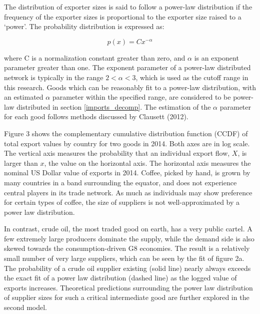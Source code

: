 \documentclass[10pt,letterpaper]{article}
\begin{document}
The distribution of exporter sizes is said to follow a power-law distribution if the frequency of the exporter sizes is proportional to the exporter size raised to a `power'. The probability distribution is expressed as:

\begin{equation}
p(x) = Cx^{-\alpha}
\end{equation}

where C is a normalization constant greater than zero, and $\alpha$ is an exponent parameter greater than one. The exponent parameter of a power-law distributed network is typically in the range $2 < \alpha < 3$, which is used as the cutoff range in this research. Goods which can be reasonably fit to a power-law distribution, with an estimated $\alpha$ parameter within the specified range, are considered to be power-law distributed in section \ref{imports_decomp}. The estimation of the $\alpha$ parameter for each good follows methods discussed by Clausett (2012).

Figure 3 shows the complementary cumulative distribution function (CCDF) of total export values by country for two goods in 2014. Both axes are in log scale. The vertical axis measures the probability that an individual export flow, $X$, is larger than $x$, the value on the horizontal axis. The horizontal axis measures the nominal US Dollar value of exports in 2014. Coffee, picked by hand, is grown by many countries in a band surrounding the equator, and does not experience central players in its trade network. As much as individuals may show preference for certain types of coffee, the size of suppliers is not well-approximated by a power law distribution. 

In contrast, crude oil, the most traded good on earth, has a very public cartel. A few extremely large producers dominate the supply, while the demand side is also skewed towards the consumption-driven G8 economies. The result is a relatively small number of very large suppliers, which can be seen by the fit of figure 2a. The probability of a crude oil supplier existing (solid line) nearly always exceeds the exact fit of a power law distribution (dashed line) as the logged value of exports increases. Theoretical predictions surrounding the power law distribution of supplier sizes for such a critical intermediate good are further explored in the second model. 
\end{document}
